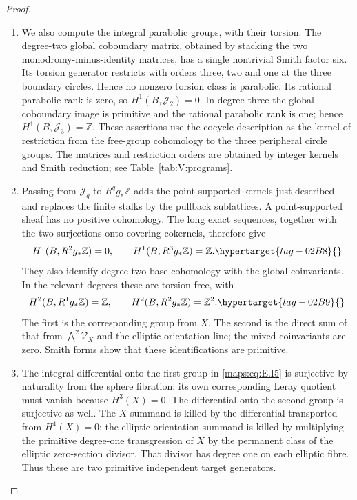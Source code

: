 \documentclass[11pt,a4paper]{article}
\numberwithin{equation}{section}
\theoremstyle{definition}
\begin{document}
\begin{proof}
\begin{enumerate}[label=\arabic*.,leftmargin=*]
\item We also compute the integral parabolic groups, with their torsion.
The degree-two global coboundary matrix, obtained by stacking
the two monodromy-minus-identity matrices, has a single nontrivial
Smith factor six. Its torsion generator restricts with orders
three, two and one at the three boundary circles. Hence no
nonzero torsion class is parabolic. Its rational parabolic rank
is zero, so \(H^1(B,\mathcal J_2)=0\). In degree three the
global coboundary image is primitive and the rational parabolic
rank is one; hence \(H^1(B,\mathcal J_3)=\mathbb Z\).
These assertions use the cocycle description as the kernel of
restriction from the free-group cohomology to the three
peripheral circle groups. The matrices and restriction orders are obtained by integer kernels and Smith reduction; see \hyperlink{prog:V:resolved}{Table~\ref*{tab:V:programs}}.

\item Passing from \(\mathcal J_q\) to \(R^qg_*\mathbb Z\)
adds the point-supported kernels just described and replaces
the finite stalks by the pullback sublattices. A point-supported
sheaf has no positive cohomology. The long exact sequences,
together with the two surjections onto covering cokernels,
therefore give
\begin{equation}
 H^1(B,R^2g_*\mathbb Z)=0,\qquad
 H^1(B,R^3g_*\mathbb Z)=\mathbb Z.
 \hypertarget{tag-02B8}{}\label{maps:eq:E.I4}
\end{equation}
They also identify degree-two base cohomology with the global
coinvariants. In the relevant degrees these are torsion-free,
with
\begin{equation}
 H^2(B,R^1g_*\mathbb Z)=\mathbb Z,
 \qquad H^2(B,R^2g_*\mathbb Z)=\mathbb Z^2.
 \hypertarget{tag-02B9}{}\label{maps:eq:E.I5}
\end{equation}
The first is the corresponding group from \(X\). The second
is the direct sum of that from \(\bigwedge^2\mathcal V_X\)
and the elliptic orientation line; the mixed coinvariants are
zero. Smith forms show that these identifications are primitive.

\item The integral differential onto the first group in \eqref{maps:eq:E.I5} is
surjective by naturality from the sphere fibration: its own
corresponding Leray quotient must vanish because \(H^3(X)=0\).
The differential onto the second group is surjective as well.
The \(X\) summand is killed by the differential transported
from \(H^4(X)=0\); the elliptic orientation summand is killed
by multiplying the primitive degree-one transgression of \(X\)
by the permanent class of the elliptic zero-section divisor.
That divisor has degree one on each elliptic fibre. Thus these are two primitive independent target generators.


\end{enumerate}
\end{proof}
\end{document}
